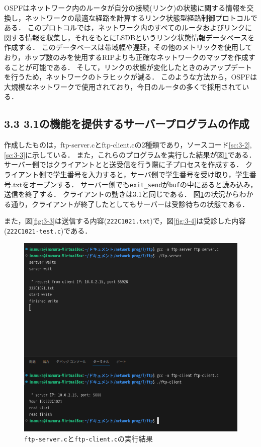 \documentclass[documentclass]{jsarticle}
\begin{document}
OSPFはネットワーク内のルータが自分の接続(リンク)の状態に関する情報を交換し，ネットワークの最適な経路を計算するリンク状態型経路制御プロトコルである．
このプロトコルでは，ネットワーク内のすべてのルータおよびリンクに関する情報を収集し，それをもとにLSDBというリンク状態情報データベースを作成する．
このデータベースは帯域幅や遅延，その他のメトリックを使用しており，ホップ数のみを使用するRIPよりも正確なネットワークのマップを作成することが可能である．
そして，リンクの状態が変化したときのみアップデートを行うため，ネットワークのトラヒックが減る．
このような方法から，OSPFは大規模なネットワークで使用されており，今日のルータの多くで採用されている．



\subsection*{3.3 3.1の機能を提供するサーバープログラムの作成}
作成したものは，ftp-server.cとftp-client.cの2種類であり，ソースコード\ref*{sc:3-2},\ref*{sc:3-3}に示している．
また，これらのプログラムを実行した結果が図\ref*{fig:3-2}である．
サーバー側ではクライアントとと送受信を行う際に子プロセスを作成する．
クライアント側で学生番号を入力すると，サーバ側で学生番号を受け取り，学生番号.txtをオープンする．
サーバー側でも\texttt{exit\_send}が\texttt{buf}の中にあると読み込み，送信を終了する．
クライアントの動きは3.1と同じである．
図\ref*{fig:3-2}の状況からわかる通り，クライアントが終了したとしてもサーバーは受診待ちの状態である．

また，図\ref*{fig:3-3}は送信する内容(\texttt{222C1021.txt})で，図\ref*{fig:3-4}は受診した内容(\texttt{222C1021-test.c})である．




\begin{figure}[H]
  \begin{center}
    \includegraphics*[scale=0.7]{figure/3-2.png}
  \end{center}
  \caption{\texttt{ftp-server.c}と\texttt{ftp-client.c}の実行結果}
  \label{fig:3-2}
\end{figure}
\end{document}
